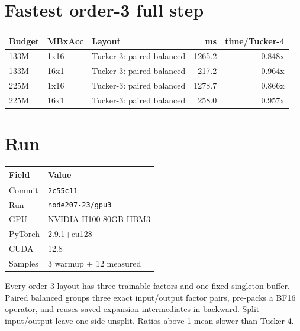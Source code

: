 \documentclass[10pt]{article}
\begin{document}
\section{Fastest order-3 full step}
\begin{center}
\small
\begin{tabular}{lllrr}
\toprule
\textbf{Budget} & \textbf{MBxAcc} & \textbf{Layout} & \textbf{ms} & \textbf{time/Tucker-4} \\
\midrule
133M & 1x16 & Tucker-3: paired balanced & 1265.2 & 0.848x \\
133M & 16x1 & Tucker-3: paired balanced & 217.2 & 0.964x \\
225M & 1x16 & Tucker-3: paired balanced & 1278.7 & 0.866x \\
225M & 16x1 & Tucker-3: paired balanced & 258.0 & 0.957x \\
\bottomrule
\end{tabular}
\end{center}
\section{Run}
\begin{center}
\small
\begin{tabular}{ll}
\toprule
\textbf{Field} & \textbf{Value} \\
\midrule
Commit & \texttt{2c55c11} \\
Run & \texttt{node207-23/gpu3} \\
GPU & NVIDIA H100 80GB HBM3 \\
PyTorch & 2.9.1+cu128 \\
CUDA & 12.8 \\
Samples & 3 warmup + 12 measured \\
\bottomrule
\end{tabular}
\end{center}
\footnotesize Every order-3 layout has three trainable factors and one fixed singleton buffer. Paired balanced groups three exact input/output factor pairs, pre-packs a BF16 operator, and reuses saved expansion intermediates in backward. Split-input/output leave one side unsplit. Ratios above 1 mean slower than Tucker-4.
\end{document}
